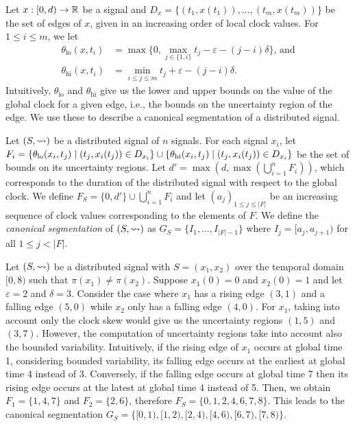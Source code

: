 Let $x : [0,d) \to \mathbb{R}$ be a signal and $D_x = \{(t_1, x(t_1)), \ldots, (t_m, x(t_m))\}$ be the set of edges of $x$, given in an increasing order of local clock values.
For $1 \leq i \leq m$, we let 
\begin{align*}
	\theta_{\text{lo}}(x,t_i) &= \max\{0, \max_{j \in \{1, i\}} t_j - \varepsilon - (j-i)\delta\} \text{, and} \\
	\theta_{\text{hi}}(x,t_i) &= \min_{i \leq j \leq m} t_j + \varepsilon - (j-i)\delta.
\end{align*}
Intuitively, $\theta_{\text{lo}}$ and $\theta_{\text{hi}}$ give us the lower and upper bounds on the value of the global clock for a given edge, i.e., the bounds on the uncertainty region of the edge.
We use these to describe a canonical segmentation of a distributed signal.

Let $(S,{\rightsquigarrow})$ be a distributed signal of $n$ signals.
For each signal $x_i$, let $F_i = \{\theta_{\text{lo}}(x_i, t_j) \st (t_j, x_i(t_j)) \in D_{x_i}\} \cup \{\theta_{\text{hi}}(x_i, t_j) \st (t_j, x_i(t_j)) \in D_{x_i}\}$ be the set of bounds on its uncertainty regions.
Let $d' = \max(d, \max (\bigcup_{i = 1}^{n} F_i))$, which corresponds to the duration of the distributed signal with respect to the global clock.
We define $F_S = \{0, d'\} \cup \bigcup_{i = 1}^{n} F_i$ and let $(a_j)_{1 \leq j \leq |F|}$ be an increasing sequence of clock values corresponding to the elements of $F$.
We define the \emph{canonical segmentation} of $(S,{\rightsquigarrow})$ as $G_S = \{I_1, \ldots, I_{|F| - 1}\}$ where $I_j = [a_j, a_{j+1})$ for all $1 \leq j < |F|$.

\begin{example} \label{ex:canonseg}
	Let $(S, {\rightsquigarrow})$ be a distributed signal with $S = (x_1, x_2)$ over the temporal domain $[0,8)$ such that $\pi(x_1) \neq \pi(x_2)$.
	Suppose $x_1(0) = 0$ and $x_2(0) = 1$ and let $\varepsilon = 2$ and $\delta = 3$.	
	Consider the case where $x_1$ has a rising edge $(3,1)$ and a falling edge $(5,0)$ while $x_2$ only has a falling edge $(4,0)$.
	For $x_1$, taking into account only the clock skew would give us the uncertainty regions $(1,5)$ and $(3,7)$.
	However, the computation of uncertainty regions take into account also the bounded variability.
	Intuitively, if the rising edge of $x_1$ occurs at global time 1, considering bounded variability, its falling edge occurs at the earliest at global time 4 instead of 3.
	Conversely, if the falling edge occurs at global time 7 then its rising edge occurs at the latest at global time 4 instead of 5.
	Then, we obtain $F_1 = \{1, 4, 7\}$ and $F_2 = \{2, 6\}$, therefore $F_S = \{0, 1, 2, 4, 6, 7, 8\}$.
	This leads to the canonical segmentation $G_S = \{[0,1), [1,2) ,[2,4) ,[4,6) ,[6,7) ,[7,8)\}$.		
\end{example}

